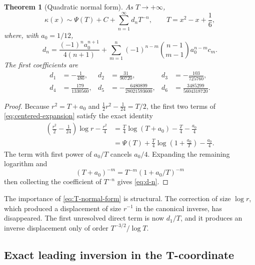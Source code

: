 \documentclass[11pt,a4paper]{article}
\numberwithin{equation}{section}
\newtheorem{theorem}{Theorem}[section]
\theoremstyle{remark}
\begin{document}
\begin{theorem}[Quadratic normal form]
\label{thm:T-normal-form}
As \(T\to+\infty\),
\begin{equation}
\kappa(x)\sim \Psi(T)+C+
\sum_{n=1}^{\infty}d_nT^{-n},
\qquad T=x^2-x+\frac16,
\label{eq:T-normal-form}
\end{equation}
where, with \(a_0=1/12\),
\begin{equation}
d_n=
\frac{(-1)^n a_0^{n+1}}{4(n+1)}
+\sum_{m=1}^{n}
(-1)^{n-m}\binom{n-1}{m-1}a_0^{n-m}c_m.
\label{eq:d-n}
\end{equation}
The first coefficients are
\begin{equation}
\begin{aligned}
d_1&=-\frac1{480},&
 d_2&=\frac{31}{90720},&
 d_3&=-\frac{103}{725760},\\
d_4&=\frac{179}{1330560},&
 d_5&=-\frac{6480899}{28021593600},&
 d_6&=\frac{3485299}{5604318720}.
\end{aligned}
\label{eq:d-first}
\end{equation}
\end{theorem}

\begin{proof}
Because \(r^2=T+a_0\) and
\(\tfrac12r^2-\tfrac1{24}=T/2\), the first two terms of
\cref{eq:centered-expansion} satisfy the exact identity
\begin{align*}
\left(\frac{r^2}{2}-\frac1{24}\right)\log r-\frac{r^2}{4}
&=\frac{T}{4}\log(T+a_0)-\frac{T}{4}-\frac{a_0}{4}\\
&=\Psi(T)+\frac{T}{4}\log\left(1+\frac{a_0}{T}\right)-\frac{a_0}{4}.
\end{align*}
The term with first power of \(a_0/T\) cancels \(a_0/4\).  Expanding the
remaining logarithm and
\[
(T+a_0)^{-m}=T^{-m}(1+a_0/T)^{-m}
\]
then collecting the coefficient of \(T^{-n}\) gives \cref{eq:d-n}.
\end{proof}

The importance of \cref{eq:T-normal-form} is structural.  The correction of
size \(\log r\), which produced a displacement of size \(r^{-1}\) in the
canonical inverse, has disappeared.  The first unresolved direct term is now
\(d_1/T\), and it produces an inverse displacement only of order
\(T^{-3/2}/\log T\).

\subsection{Exact leading inversion in the T-coordinate}
\end{document}

